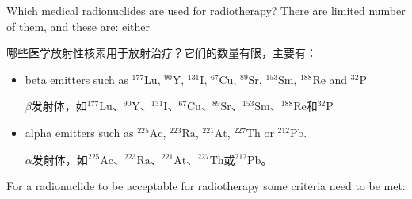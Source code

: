\documentclass[dvipsnames, svgnames,a4paper,11pt]{article}
\begin{document}
Which medical radionuclides are used for radiotherapy? There are limited number of them, and these are: either

哪些医学放射性核素用于放射治疗？它们的数量有限，主要有：
\begin{itemize}
      \item beta emitters such as ${}^\text{177}\text{Lu}$, ${}^\text{90}\text{Y}$, ${}^\text{131}\text{I}$, ${}^\text{67}\text{Cu}$, ${}^\text{89}\text{Sr}$, ${}^\text{153}\text{Sm}$, ${}^\text{188}\text{Re}$ and ${}^\text{32}\text{P}$

            $\beta$发射体，如${}^\text{177}\text{Lu}$、${}^\text{90}\text{Y}$、${}^\text{131}\text{I}$、${}^\text{67}\text{Cu}$、${}^\text{89}\text{Sr}$、${}^\text{153}\text{Sm}$、${}^\text{188}\text{Re}$和${}^\text{32}\text{P}$
      \item alpha emitters such as \(\mathrm{^{225}Ac}\), ${}^\text{223}\text{Ra}$, ${}^{221}\text{At}$, ${}^{227}\text{Th}$ or ${}^{212}\text{Pb}$.

            $\alpha$发射体，如\(\mathrm{^{225}Ac}\)、${}^\text{223}\text{Ra}$、${}^{221}\text{At}$、${}^{227}\text{Th}$或${}^{212}\text{Pb}$。
\end{itemize}

For a radionuclide to be acceptable for radiotherapy some criteria need to be met:
\end{document}
